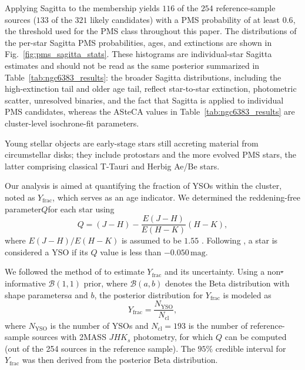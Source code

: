 \documentclass{aa}
\providecommand{\DIFaddtex}[1]{{\protect\color{red}\uwave{#1}}} %
\providecommand{\DIFdeltex}[1]{{\protect\color{red}\sout{#1}}} %
\providecommand{\DIFaddbegin}{} %
\providecommand{\DIFaddend}{} %
\providecommand{\DIFdelbegin}{} %
\providecommand{\DIFdelend}{} %
\providecommand{\DIFadd}[1]{\texorpdfstring{\DIFaddtex{#1}}{#1}} %
\providecommand{\DIFdel}[1]{\texorpdfstring{\DIFdeltex{#1}}{}} %
\providecommand{\DIFscaledelfig}{0.5}
\newlength{\DIFdelgraphicswidth} %
\newlength{\DIFdelgraphicsheight} %
\providecommand{\DIFaddincludegraphics}[2][]{{\color{blue}\fbox{\DIFOincludegraphics[#1]{#2}}}} %
\providecommand{\DIFdelincludegraphics}[2][]{%
\sbox{\DIFdelgraphicsbox}{\DIFOincludegraphics[#1]{#2}}%
\settoboxwidth{\DIFdelgraphicswidth}{\DIFdelgraphicsbox} %
\settoboxtotalheight{\DIFdelgraphicsheight}{\DIFdelgraphicsbox} %
\scalebox{\DIFscaledelfig}{%
\parbox[b]{\DIFdelgraphicswidth}{\usebox{\DIFdelgraphicsbox}\\[-\baselineskip] \rule{\DIFdelgraphicswidth}{0em}}\llap{\resizebox{\DIFdelgraphicswidth}{\DIFdelgraphicsheight}{%
\setlength{\unitlength}{\DIFdelgraphicswidth}%
\begin{picture}(1,1)%
\thicklines\linethickness{2pt} %
{\color[rgb]{1,0,0}\put(0,0){\framebox(1,1){}}}%
{\color[rgb]{1,0,0}\put(0,0){\line( 1,1){1}}}%
{\color[rgb]{1,0,0}\put(0,1){\line(1,-1){1}}}%
\end{picture}%
}\hspace*{3pt}}} %
} %
\DeclareRobustCommand{\DIFaddbegin}{\DIFOaddbegin \let\includegraphics\DIFaddincludegraphics} %
\DeclareRobustCommand{\DIFaddend}{\DIFOaddend \let\includegraphics\DIFOincludegraphics} %
\DeclareRobustCommand{\DIFdelbegin}{\DIFOdelbegin \let\includegraphics\DIFdelincludegraphics} %
\DeclareRobustCommand{\DIFdelend}{\DIFOaddend \let\includegraphics\DIFOincludegraphics} %
\begin{document}
Applying Sagitta to the membership yields $116$ of the $254$ reference-sample sources ($133$ of the $321$ likely candidates) with a PMS probability of at least $0.6$, the threshold used for the PMS class throughout this paper. The distributions of the per-star Sagitta PMS probabilities, ages, and extinctions are shown in Fig.~\ref{fig:pms_sagitta_stats}. These histograms are individual-star Sagitta estimates and should not be read as the same posterior summarized in Table~\ref{tab:ngc6383_results}: the broader Sagitta distributions, including the high-extinction tail and older age tail, reflect star-to-star extinction, photometric scatter, unresolved binaries, and the fact that Sagitta is applied to individual PMS candidates, whereas the ASteCA values in Table~\ref{tab:ngc6383_results} are cluster-level isochrone-fit parameters.


Young stellar objects are early-stage stars still accreting material from circumstellar disks; they include protostars and the more evolved PMS stars, the latter comprising classical T-Tauri and Herbig Ae/Be stars.

Our analysis is aimed at quantifying the fraction of YSOs within the cluster, noted as $ Y_{\text{frac}} $, which serves as an age indicator. We determined the reddening-free parameter\DIFaddbegin \DIFadd{, }\DIFaddend $ Q $\DIFaddbegin \DIFadd{, }\DIFaddend for each star using
\begin{equation}
	Q = (J - H) - \frac{E(J-H)}{E(H - K)} (H-K),
\end{equation}
where $ E(J-H)/E(H-K) $ is assumed to be $1.55$ \citep{1990ARA&A..28...37M}. Following \citet{2013MNRAS.436.1465B}, a star is considered a YSO if its $ Q $ value is less than $-0.050\,\mathrm{mag}$.

We followed the method of \citet{2011PASA...28..128C} to estimate $ Y_{\text{frac}} $ and its uncertainty. Using a non\DIFdelbegin \DIFdel{-}\DIFdelend informative $\mathcal{B}(1, 1)$ prior, where $\mathcal{B}(a,b)$ denotes the Beta distribution with shape parameters\DIFaddbegin \DIFadd{, }\DIFaddend $a$ and $b$, the posterior distribution for $ Y_{\text{frac}} $ is modeled as
\begin{equation}
	Y_{\text{frac}} = \frac{N_{\text{YSO}}}{N_{\text{cl}}},
\end{equation}
where $ N_{\text{YSO}} $ is the number of YSOs and $ N_{\text{cl}}=193 $ is the number of reference-sample sources with 2MASS $JHK_s$ photometry, for which $Q$ can be computed (out of the 254 sources in the reference sample). The $95\%$ credible interval for $ Y_{\text{frac}} $ was then derived from the posterior Beta distribution.
\end{document}
